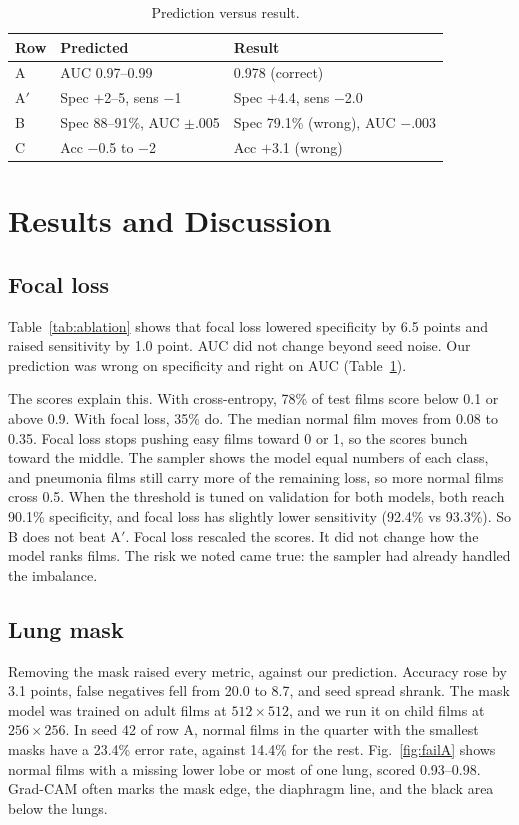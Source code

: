 \documentclass[conference]{IEEEtran}
\begin{document}
\begin{table}[t]
\caption{Prediction versus result.}
\label{tab:pred}
\centering
\footnotesize
\begin{tabular}{@{}lll@{}}
\toprule
Row & Predicted & Result \\
\midrule
A & AUC 0.97--0.99 & 0.978 (correct) \\
A$'$ & Spec $+$2--5, sens $-$1 & Spec $+$4.4, sens $-$2.0 \\
B & Spec 88--91\%, AUC $\pm$.005 & Spec 79.1\% (wrong), AUC $-$.003 \\
C & Acc $-$0.5 to $-$2 & Acc $+$3.1 (wrong) \\
\bottomrule
\end{tabular}
\end{table}

\section{Results and Discussion}
\subsection{Focal loss}
Table~\ref{tab:ablation} shows that focal loss lowered specificity by 6.5 points and raised sensitivity by 1.0 point. AUC did not change beyond seed noise. Our prediction was wrong on specificity and right on AUC (Table~\ref{tab:pred}).

The scores explain this. With cross-entropy, 78\% of test films score below 0.1 or above 0.9. With focal loss, 35\% do. The median normal film moves from 0.08 to 0.35. Focal loss stops pushing easy films toward 0 or 1, so the scores bunch toward the middle. The sampler shows the model equal numbers of each class, and pneumonia films still carry more of the remaining loss, so more normal films cross 0.5. When the threshold is tuned on validation for both models, both reach 90.1\% specificity, and focal loss has slightly lower sensitivity (92.4\% vs 93.3\%). So B does not beat A$'$. Focal loss rescaled the scores. It did not change how the model ranks films. The risk we noted came true: the sampler had already handled the imbalance.

\subsection{Lung mask}
Removing the mask raised every metric, against our prediction. Accuracy rose by 3.1 points, false negatives fell from 20.0 to 8.7, and seed spread shrank. The mask model was trained on adult films at $512\times512$, and we run it on child films at $256\times256$. In seed 42 of row A, normal films in the quarter with the smallest masks have a 23.4\% error rate, against 14.4\% for the rest. Fig.~\ref{fig:failA} shows normal films with a missing lower lobe or most of one lung, scored 0.93--0.98. Grad-CAM often marks the mask edge, the diaphragm line, and the black area below the lungs.
\end{document}
